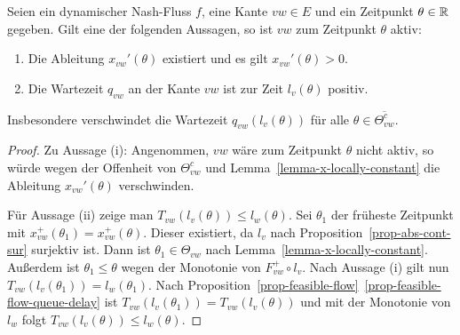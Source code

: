 \begin{lemma}\label{lemma-nash-flow-waiting-queue-implies-active-edge}
	Seien ein dynamischer Nash-Fluss $f$, eine Kante $vw\in E$ und ein Zeitpunkt $\theta\in\mathbb{R}$ gegeben.
	Gilt eine der folgenden Aussagen, so ist $vw$ zum Zeitpunkt $\theta$ aktiv:
	\begin{enumerate}[label=(\roman*)]
		\item Die Ableitung $x_{vw}'(\theta)$ existiert und es gilt $x_{vw}'(\theta)> 0$.
		\item Die Wartezeit $q_{vw}$ an der Kante $vw$ ist zur Zeit $l_v(\theta)$ positiv.
	\end{enumerate}
	Insbesondere verschwindet die Wartezeit $q_{vw}(l_v(\theta))$ für alle $\theta\in\overline{\Theta_{vw}^c}$.
\end{lemma}
\begin{proof}
	Zu Aussage (i): Angenommen, $vw$ wäre zum Zeitpunkt $\theta$ nicht aktiv, so würde wegen der Offenheit von $\Theta_{vw}^c$ und Lemma~\ref{lemma-x-locally-constant} die Ableitung $x_{vw}'(\theta)$ verschwinden.
	
	Für Aussage (ii) zeige man $T_{vw}(l_v(\theta)) \leq l_w(\theta)$.
	Sei $\theta_1$ der früheste Zeitpunkt mit $x_{vw}^+(\theta_1)= x_{vw}^+(\theta)$.
	Dieser existiert, da $l_v$ nach Proposition~\ref{prop-abs-cont-sur} surjektiv ist.
	Dann ist $\theta_1\in \Theta_{vw}$ nach Lemma~\ref{lemma-x-locally-constant}.
	Außerdem ist $\theta_1 \leq \theta$ wegen der Monotonie von $F_{vw}^+ \circ l_v$.
	Nach Aussage (i) gilt nun $T_{vw}(l_v(\theta_1)) = l_w(\theta_1)$.
	Nach Proposition~\ref{prop-feasible-flow}~\ref{prop-feasible-flow-queue-delay} ist $T_{vw}(l_v(\theta_1)) = T_{vw}(l_v(\theta))$ und mit der Monotonie von $l_w$ folgt $T_{vw}(l_v(\theta))\leq l_w(\theta)$.
\end{proof}

